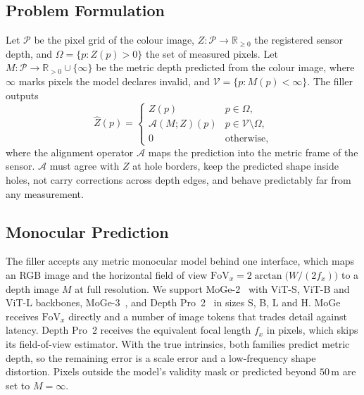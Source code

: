 \documentclass[conference]{IEEEtran}
\newcommand{\R}{\mathbb{R}}
\newcommand{\Dm}{Z}            %
\newcommand{\Dp}{M}            %
\newcommand{\Om}{\Omega}       %
\begin{document}
\subsection{Problem Formulation}
\label{sec:formulation}
Let \(\mathcal{P}\) be the pixel grid of the colour image, \(\Dm:\mathcal{P}\to
\R_{\ge0}\) the registered sensor depth, and \(\Om=\{p:\Dm(p)>0\}\) the set of
measured pixels. Let \(\Dp:\mathcal{P}\to\R_{>0}\cup\{\infty\}\) be the metric
depth predicted from the colour image, where \(\infty\) marks pixels the model
declares invalid, and \(\mathcal{V}=\{p:\Dp(p)<\infty\}\). The filler outputs
\begin{equation}
  \hat \Dm(p) =
  \begin{cases}
    \Dm(p) & p\in\Om,\\
    \mathcal{A}(\Dp;\Dm)(p) & p\in\mathcal{V}\setminus\Om,\\
    0 & \text{otherwise},
  \end{cases}
  \label{eq:fill}
\end{equation}
where the alignment operator \(\mathcal{A}\) maps the prediction into the
metric frame of the sensor. \(\mathcal{A}\) must agree with \(\Dm\) at hole
borders, keep the predicted shape inside holes, not carry corrections across
depth edges, and behave predictably far from any measurement.

\subsection{Monocular Prediction}
\label{sec:prior}
The filler accepts any metric monocular model behind one interface, which maps
an RGB image and the horizontal field of view
\(\mathrm{FoV}_x=2\arctan\big(W/(2f_x)\big)\) to a depth image
\(\Dp\) at full resolution. We support MoGe-2~\cite{wang2025moge2} with ViT-S,
ViT-B and ViT-L backbones, MoGe-3~\cite{kong2026moge3}, and Depth
Pro~2~\cite{hu2026depthpro2} in sizes S, B, L and H. MoGe receives
\(\mathrm{FoV}_x\) directly and a number of image tokens that trades detail
against latency. Depth Pro~2 receives the equivalent focal length \(f_x\) in
pixels, which skips its field-of-view estimator. With the true intrinsics, both
families predict metric depth, so the remaining error is a scale error and a
low-frequency shape distortion. Pixels outside the model's validity mask or
predicted beyond \(50\,\)m are set to \(\Dp=\infty\).
\end{document}
